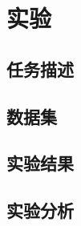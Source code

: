 \chapter{实验}
\label{cha:exp}

\section{任务描述}
\label{sec:task}

\section{数据集}
\label{sec:ds}

\section{实验结果}
\label{sec:results}

\section{实验分析}
\label{sec:analysis}